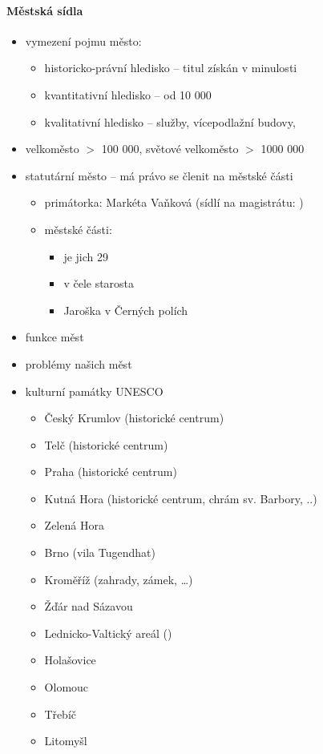 \paragraph{Městská sídla}
\begin{itemize}
\item vymezení pojmu město:
	\begin{itemize}
	\item historicko-právní hledisko -- titul získán v minulosti
	\item kvantitativní hledisko -- od 10 000 
	\item kvalitativní hledisko -- služby, vícepodlažní budovy, 
	\end{itemize}
\item velkoměsto $>$ 100 000, světové velkoměsto $>$ 1000 000
\item statutární město -- má právo se členit na městské části
	\begin{itemize}
	\item primátorka: Markéta Vaňková (sídlí na magistrátu:  )
	\item městské části: 
		\begin{itemize}
		\item je jich 29
		\item v čele starosta
		\item Jaroška v Černých polích
		\end{itemize}
	\end{itemize}
\item funkce měst
\item problémy našich měst
\item kulturní památky UNESCO
	\begin{itemize}
	\item Český Krumlov (historické centrum)
	\item Telč (historické centrum)
	\item Praha (historické centrum)
	\item Kutná Hora (historické centrum, chrám sv. Barbory, ..)
	\item Zelená Hora
	\item Brno (vila Tugendhat)
	\item Kroměříž (zahrady, zámek, \ldots)
	\item Žďár nad Sázavou
	\item Lednicko-Valtický areál ()
	\item Holašovice
	\item Olomouc
	\item Třebíč
	\item Litomyšl

\end{itemize}
\end{itemize}
